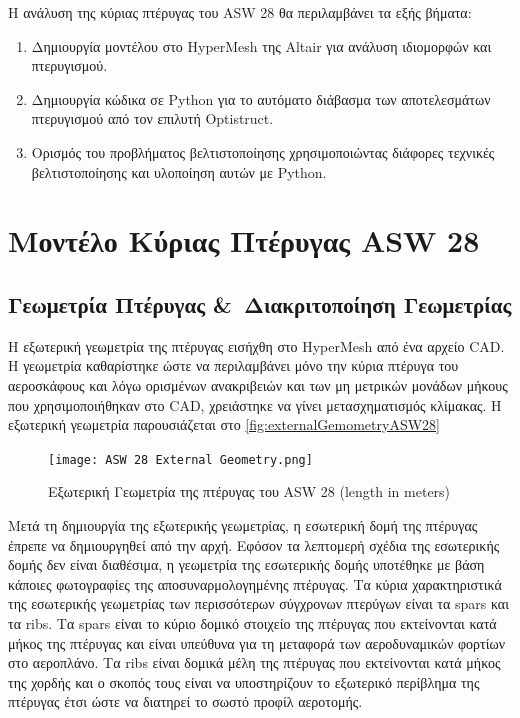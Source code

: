 Η ανάλυση της κύριας πτέρυγας του \textlatin{ASW 28} θα περιλαμβάνει τα εξής βήματα:

\begin{enumerate}
  \def\labelenumi{\arabic{enumi}.}
  \item
    Δημιουργία μοντέλου στο \textlatin{HyperMesh} της \textlatin{Altair} για ανάλυση ιδιομορφών και πτερυγισμού.
  \item
    Δημιουργία κώδικα σε \textlatin{Python} για το αυτόματο διάβασμα των αποτελεσμάτων πτερυγισμού από τον επιλυτή \textlatin{Optistruct}.
  \item
    Ορισμός του προβλήματος βελτιστοποίησης χρησιμοποιώντας διάφορες τεχνικές βελτιστοποίησης και υλοποίηση αυτών με \textlatin{Python}.
  \end{enumerate}
  
  

  \section{Μοντέλο Κύριας Πτέρυγας \textlatin{ASW 28}}
  \label{asw-28-main-composite-wing-model}
  
  \subsection{Γεωμετρία Πτέρυγας \&\ Διακριτοποίηση Γεωμετρίας}\label{wing-geometry-discretization}
  
  Η εξωτερική γεωμετρία της πτέρυγας εισήχθη στο \textlatin{HyperMesh} από ένα αρχείο \textlatin{CAD}. Η γεωμετρία καθαρίστηκε ώστε να περιλαμβάνει μόνο την κύρια πτέρυγα του αεροσκάφους και λόγω ορισμένων ανακριβειών και των μη μετρικών μονάδων μήκους που χρησιμοποιήθηκαν στο \textlatin{CAD}, χρειάστηκε να γίνει μετασχηματισμός κλίμακας. Η εξωτερική γεωμετρία παρουσιάζεται στο \autoref{fig:externalGemometryASW28}
  

\begin{figure}[H]
    \centering
    \texttt{[image: ASW 28 External Geometry.png]}
    \caption{Εξωτερική Γεωμετρία της πτέρυγας του \textlatin{ASW 28} \textlatin{(length in meters)}}
    \label{fig:externalGemometryASW28}
\end{figure}

Μετά τη δημιουργία της εξωτερικής γεωμετρίας, η εσωτερική δομή της πτέρυγας έπρεπε να δημιουργηθεί από την αρχή. Εφόσον τα λεπτομερή σχέδια της εσωτερικής δομής δεν είναι διαθέσιμα, η γεωμετρία της εσωτερικής δομής υποτέθηκε με βάση κάποιες φωτογραφίες της αποσυναρμολογημένης πτέρυγας. Τα κύρια χαρακτηριστικά της εσωτερικής γεωμετρίας των περισσότερων σύγχρονων πτερύγων είναι τα \textlatin{spars} και τα \textlatin{ribs}. Τα \textlatin{spars} είναι το κύριο δομικό στοιχείο της πτέρυγας που εκτείνονται κατά μήκος της πτέρυγας και είναι υπεύθυνα για τη μεταφορά των αεροδυναμικών φορτίων στο αεροπλάνο. Τα \textlatin{ribs} είναι δομικά μέλη της πτέρυγας που εκτείνονται κατά μήκος της χορδής και ο σκοπός τους είναι να υποστηρίζουν το εξωτερικό περίβλημα της πτέρυγας έτσι ώστε να διατηρεί το σωστό προφίλ αεροτομής.

